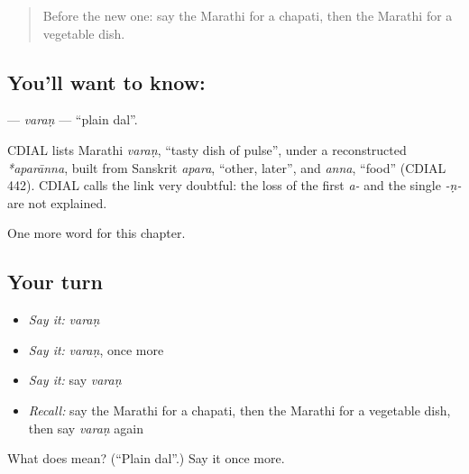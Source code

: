 \label{lesson:MR-C136-varan}



\begin{quote}
Before the new one: say the Marathi for a chapati, then the Marathi for a vegetable dish.
\end{quote}

\subsection*{You'll want to know: }
\textbf{} — \emph{varaṇ} — \textquotedblleft{}plain dal\textquotedblright{}.

\begin{cousinweb}
CDIAL lists Marathi \emph{varaṇ}, \textquotedblleft{}tasty dish of pulse\textquotedblright{}, under a reconstructed \emph{*aparānna}, built from Sanskrit \emph{apara}, \textquotedblleft{}other, later\textquotedblright{}, and \emph{anna}, \textquotedblleft{}food\textquotedblright{} (CDIAL 442). CDIAL calls the link very doubtful: the loss of the first \emph{a-} and the single \emph{-ṇ-} are not explained.
\end{cousinweb}

\begin{grammarlens}[title={What you've built}]
One more word for this chapter.
\end{grammarlens}

\subsection*{Your turn}
\begin{itemize}
\raggedright
  \item \emph{Say it:} \emph{varaṇ}
  \item \emph{Say it:} \emph{varaṇ}, once more
  \item \emph{Say it:} say \emph{varaṇ}
  \item \emph{Recall:} say the Marathi for a chapati, then the Marathi for a vegetable dish, then say \emph{varaṇ} again
\end{itemize}

\begin{tcolorbox}[breakable,colback=teal!4,colframe=teal!35!black,title={Before you move on}]
What does  mean? (\textquotedblleft{}Plain dal\textquotedblright{}.) Say it once more.
\end{tcolorbox}
